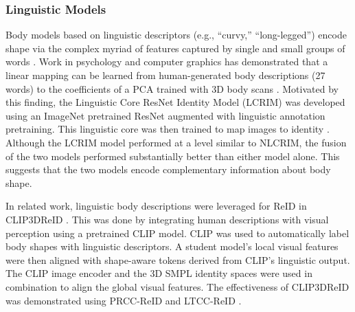\subsubsection{Linguistic Models} 
Body models based on linguistic descriptors  (e.g., “curvy,” “long-legged”)  encode  shape via the complex myriad of features captured by single and small groups of words \cite{myers2023recognizing}. 
Work in psychology \cite{hill2016creating} and computer graphics \cite{streuber2016body} has  demonstrated that a linear mapping can be learned from human-generated body descriptions (27 words) to the coefficients of a PCA trained with 3D body scans \cite{loper2015smpl}. Motivated by this finding, the Linguistic Core ResNet Identity Model (LCRIM)
 was developed using an ImageNet pretrained ResNet augmented
with linguistic annotation pretraining. This linguistic core was then trained to map images to identity \cite{myers2023recognizing}. Although the LCRIM model performed at a level similar to NLCRIM, the fusion of the two models performed substantially better than either model alone. This suggests that the two models encode complementary 
information about body shape.

In related work, linguistic body descriptions were
leveraged for ReID in CLIP3DReID \cite{liu2024distilling}. This was done by integrating human descriptions with visual perception using a pretrained CLIP model. CLIP was used to automatically label body shapes with linguistic descriptors. A student model's local visual features were then aligned with shape-aware tokens derived from CLIP's linguistic output. The CLIP image encoder and the 3D SMPL \cite{loper2015smpl} identity spaces were used in combination to align the global visual features. The effectiveness
of CLIP3DReID was demonstrated using  PRCC-ReID \cite{yang2019person} and  LTCC-ReID \cite{qian2020long}.



